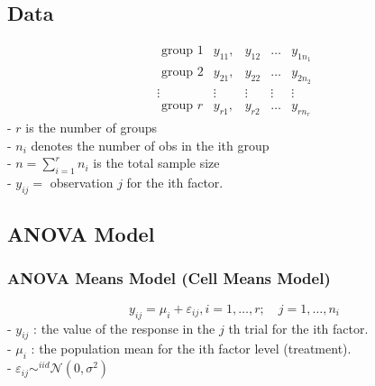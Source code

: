 \documentclass[11pt,a4paper]{article}
\begin{document}
\subsection{Data}
$$\begin{array}{ccccc}\text { group } 1 & y_{11}, & y_{12} & \ldots & y_{1 n_{1}} \\ \text { group } 2 & y_{21}, & y_{22} & \ldots & y_{2 n_{2}} \\ \vdots & \vdots & \vdots & \vdots & \vdots \\ \text { group } r & y_{r 1}, & y_{r 2} & \ldots & y_{r n_{r}}\end{array}$$
- $r$ is the number of groups\\
- $n_{i}$ denotes the number of obs in the ith group\\
- $n=\sum_{i=1}^{r} n_{i}$ is the total sample size\\
- $y_{i j}=$ observation $j$ for the ith factor.
\subsection{ANOVA Model}
\subsubsection{ANOVA Means Model (Cell Means Model)}
$$
y_{i j}=\mu_{i}+\varepsilon_{i j}, i=1, \ldots, r ; \quad j=1, \ldots, n_{i}
$$
- $y_{i j}$ : the value of the response in the $j$ th trial for the ith factor.\\
- $\mu_{i}$ : the population mean for the ith factor level (treatment).\\
- $\varepsilon_{i j} \sim^{i i d} \mathcal{N}\left(0, \sigma^{2}\right)$
\end{document}
